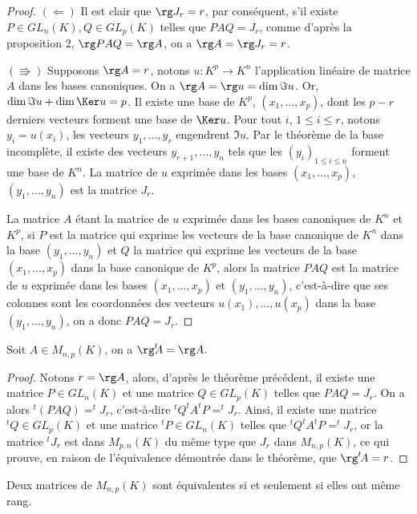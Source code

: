 \documentclass[class=report,crop=false]{standalone}
\begin{document}
\begin{proof}
$(\Leftarrow)$ Il est clair que $\rg J_r=r$, par conséquent, 
s'il existe $P\in GL_n(K), Q\in GL_p(K)$ telles que $PAQ=J_r$, 
comme d'après la proposition $2$, $\rg PAQ=\rg A$, on a $\rg A=\rg J_r=r$.

$(\Rrightarrow)$ Supposons $\rg A=r$, notons $u: K^p\longrightarrow K^n$ 
l'application linéaire de matrice $A$ dans les bases canoniques. 
On a $\rg A=\rg u=\dim\Im u$. Or, $\dim\Im u+\dim\Ker u=p$. 
Il existe une base de $K^p$, $(x_1,\dots,x_p)$, dont les $p-r$ 
derniers vecteurs forment une base de $\Ker u$. Pour tout $i$, 
$1\leq i\leq r$, notons $y_i=u(x_i)$, les vecteurs $y_1,\dots,y_r$ 
engendrent $\Im u$. Par le théorème de la base incomplète, il 
existe des vecteurs $y_{r+1},\dots,y_n$ tels que les $(y_i)_{1\leq i\leq n}$ 
forment une base de $K^n$. La matrice de $u$ exprimée dans 
les bases $(x_1,\dots,x_p)$, $(y_1,\dots,y_n)$ est la matrice $J_r$. 

La matrice $A$ étant la matrice de $u$ exprimée dans les bases 
canoniques de $K^n$ et $K^p$, si $P$ est la matrice qui exprime 
les vecteurs de la base canonique de $K^n$ dans la base $(y_1,\dots,y_n)$ 
et $Q$ la matrice qui exprime les vecteurs de la base $(x_1,\dots,x_p)$ 
dans la base canonique de $K^p$, alors la matrice $PAQ$ est la matrice 
de $u$ exprimée dans les bases $(x_1,\dots,x_p)$ et $(y_1,\dots,y_n)$, 
c'est-à-dire que ses colonnes sont les coordonnées des vecteurs 
$u(x_1),\dots,u(x_p)$ dans la base $(y_1,\dots,y_n)$, on a donc $PAQ=J_r.$
\end{proof}


\begin{corollaire}
Soit $A\in M_{n,p}(K)$, on a $\rg^t\!\!A=\rg A.$
\end{corollaire} 

\begin{proof}
Notons $r=\rg A$, alors, d'après le théorème précédent, 
il existe une matrice $P\in GL_n(K)$ et une matrice 
$Q\in GL_p(K)$ telles que $PAQ=J_r$. On a alors 
$^t(PAQ)=^t\!\!J_r$, c'est-à-dire $^t\!Q^t\!A^t\!P=^t\!\!J_r$. 
Ainsi, il existe une matrice $^t\!Q\in GL_p(K)$ et une matrice 
$^t\!P\in GL_n(K)$ telles que $^t\!Q^t\!A^t\!P=^t\!\!J_r$, or 
la matrice $^t\!\!J_r$ est dans $M_{p,n}(K)$ du même type que 
$J_r$ dans $M_{n,p}(K)$, ce qui prouve, en raison de l'équivalence 
démontrée dans le théorème, que  $\rg^t\!A=r$. 
\end{proof} 


\begin{theoreme}
Deux matrices de $M_{n,p}(K)$ sont équivalentes 
si et seulement si elles ont même rang.
\end{theoreme} 
\end{document}
